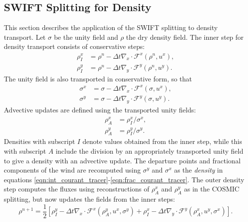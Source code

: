 \documentclass[11pt,a4paper]{article}
\begin{document}
\subsection{SWIFT Splitting for Density} \label{sec:swift_density}
This section describes the application of the SWIFT splitting to density transport.
Let $\sigma$ be the unity field and $\rho$ the dry density field.
The inner step for density transport consists of conservative steps:
\begin{subequations}
\begin{align} \label{eqn:swift_density_x}
    \rho_I^x &= \rho^n - \Delta{t} \nabla_x\cdot \mathcal{F}^x(\rho^n, u^x), \\
    \rho_I^y &= \rho^n - \Delta{t} \nabla_y\cdot \mathcal{F}^y(\rho^n, u^y).
\end{align}
\end{subequations}
The unity field is also transported in conservative form, so that
\begin{subequations} \label{eqn:sigma_x_sigma_y}
\begin{align}
    \sigma^x &= \sigma - \Delta{t} \nabla_x\cdot \mathcal{F}^x(\sigma, u^x), \\
    \sigma^y &= \sigma - \Delta{t} \nabla_y\cdot \mathcal{F}^y(\sigma, u^y).
\end{align}
\end{subequations}
Advective updates are defined using the transported unity fields:
\begin{subequations}
\begin{align} \label{eqn:swift_density_adv_x}
    \rho^x_A &= \rho_I^x / \sigma^x, \\ \label{eqn:swift_density_adv_y}
    \rho^y_A &= \rho_I^y / \sigma^y.
\end{align}
\end{subequations}
Densities with subscript $I$ denote values obtained from the inner step, while this with subscript $A$ include the division by an appropriately transported unity field to give a density with an advective update.
The departure points and fractional components of the wind are recomputed using $\sigma^y$ and $\sigma^x$ as the \textit{density} in equations \eqref{eqn:int_courant_tracer}-\eqref{eqn:frac_courant_tracer}.
The outer density step computes the fluxes using reconstructions of $\rho^x_A$ and $\rho^y_A$ as in the COSMIC splitting, but now updates the fields from the inner steps:
\begin{equation} \label{eqn:swift_density}
\rho^{n+1} = \frac{1}{2}\left[\rho_I^{y} - \Delta{t}\nabla_x\cdot \mathcal{F}^x(\rho^y_A, u^x, \sigma^y) + \rho_I^x - \Delta{t}\nabla_y\cdot \mathcal{F}^y(\rho^x_A, u^y, \sigma^x)\right].
\end{equation}
\end{document}
